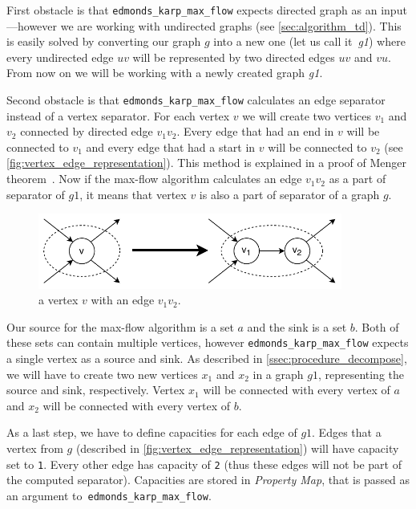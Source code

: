 \documentclass[thesis=B,english]{FITthesis}[2019/03/21]
\begin{document}
First obstacle is that \texttt{edmonds\_karp\_max\_flow} expects directed graph as an input---however we are working with undirected graphs (see \autoref{sec:algorithm_td}). This is easily solved by converting our graph $g$ into a new one (let us call it~\emph{g1}) where every undirected edge $uv$ will be represented by two directed edges $uv$ and $vu$. From now on we will be working with a newly created graph \emph{g1}.

Second obstacle is that \texttt{edmonds\_karp\_max\_flow} calculates an edge separator instead of a vertex separator. For each vertex $v$ we will create two vertices $v_1$ and $v_2$ connected by directed edge $v_1v_2$. Every edge that had an end in $v$ will be connected to $v_1$ and every edge that had a start in $v$ will be connected to $v_2$ (see \autoref{fig:vertex_edge_representation}). This method is explained in a proof of Menger theorem~\cite{menger_proof}. Now if the max-flow algorithm calculates an edge $v_1v_2$ as a part of separator of $g1$, it means that vertex $v$ is also a part of separator of a graph $g$. 

\begin{figure}[H]
	\centering
 	\includegraphics[width=10cm]{img/vertex-edge-representation.pdf}
 	\caption[ a vertex $v$ with an edge $v_1v_2$]{ a vertex $v$ with an edge $v_1v_2$.}
 	\label{fig:vertex_edge_representation}
\end{figure}

Our source for the max-flow algorithm is a set $a$ and the sink is a set $b$. Both of these sets can contain multiple vertices, however \texttt{edmonds\_karp\_max\_flow} expects a single vertex as a source and sink. As described in \autoref{ssec:procedure_decompose}, we will have to create two new vertices $x_1$ and $x_2$ in a graph $g1$, representing the source and sink, respectively. Vertex $x_1$ will be connected with every vertex of $a$ and $x_2$ will be connected with every vertex of $b$.

As a last step, we have to define capacities for each edge of $g1$. Edges that  a vertex from $g$ (described in \autoref{fig:vertex_edge_representation}) will have capacity set to \texttt{1}. Every other edge has capacity of \texttt{2} (thus these edges will not be part of the computed separator). Capacities are stored in \emph{Property Map}, that is passed as an argument to~\texttt{edmonds\_karp\_max\_flow}.
\end{document}
